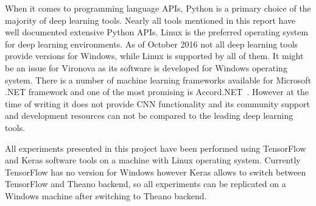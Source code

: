 \documentclass[a4paper, 11pt, table]{article}
\begin{document}
When it comes to programming language APIs, Python is a primary choice of the majority of deep learning tools. Nearly all tools mentioned in this report have well documented extensive Python APIs. Linux is the preferred operating system for deep learning environments. As of October 2016 not all deep learning tools provide versions for Windows, while Linux is supported by all of them. It might be an issue for Vironova as its software is developed for Windows operating system. There is a number of machine learning frameworks available for Microsoft .NET framework and one of the most promising is Accord.NET~\cite{accordnet}. However at the time of writing it does not provide CNN functionality and its community support and development resources can not be compared to the leading deep learning tools. 

All experiments presented in this project have been performed using TensorFlow and Keras software tools on a machine with Linux operating system. Currently TensorFlow has no version for Windows however Keras allows to switch between TensorFlow and Theano backend, so all experiments can be replicated on a Windows machine after switching to Theano backend.
\end{document}
